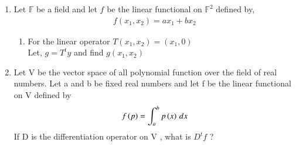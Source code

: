 \renewcommand{\theequation}{\theenumi}
\renewcommand{\thefigure}{\theenumi}
\begin{enumerate}[label=\thesubsection.\arabic*.,ref=\thesubsection.\theenumi]

\item Let $\mathbb{F}$ be a field and let $f$ be the linear functional on $\mathbb{F}^2$ defined by,
\begin{align}
f(x_1,x_2) = ax_1+bx_2
\end{align}
\begin{enumerate}
\item For the linear operator $T(x_1,x_2) = (x_1,0)$\\
Let, $g = T^ty$ and find $g(x_1,x_2)$
%
\\
\solution

\end{enumerate}
%
\item Let V be the vector space of all polynomial function over the field of real numbers. Let a and b be fixed real numbers and let f be the linear functional on V defined by  
\begin{align}
    f\left(p\right) = \int_{a}^{b} p\left(x\right) \,dx
\end{align}
If D is the differentiation operator on V , what is $D^{t}f$ ?
%
\\
\solution

\end{enumerate}
